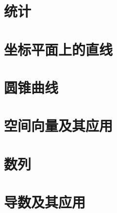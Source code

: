 \documentclass[11pt,a4paper]{ctexbook}
\begin{document}
\chapter{统计}
\chapter{坐标平面上的直线}
\chapter{圆锥曲线}
\chapter{空间向量及其应用}

\chapter{数列}
\chapter{导数及其应用}
\end{document}
